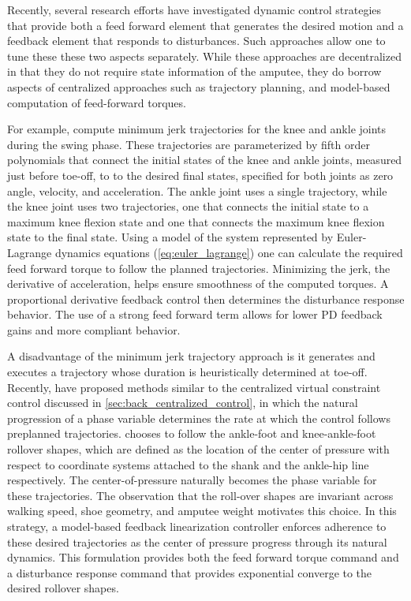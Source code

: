 Recently, several research efforts have investigated dynamic control strategies
that provide both a feed forward element that generates the desired motion and a
feedback element that responds to disturbances. Such approaches allow one to
tune these these two aspects separately. While these approaches are
decentralized in that they do not require state information of the amputee, they
do borrow aspects of centralized approaches such as trajectory planning, and
model-based computation of feed-forward torques.

For example, \citet{lenzi2014speed, lenzi2014minimum} compute minimum jerk
trajectories for the knee and ankle joints during the swing phase. These
trajectories are parameterized by fifth order polynomials that connect the
initial states of the knee and ankle joints, measured just before toe-off, to to
the desired final states, specified for both joints as zero angle, velocity, and
acceleration. The ankle joint uses a single trajectory, while the knee joint
uses two trajectories, one that connects the initial state to a maximum knee
flexion state and one that connects the maximum knee flexion state to the final
state.  Using a model of the system represented by Euler-Lagrange dynamics
equations (\cref{eq:euler_lagrange}) one can calculate the required feed forward
torque to follow the planned trajectories. Minimizing the jerk, the derivative
of acceleration, helps ensure smoothness of the computed torques. A proportional
derivative feedback control then determines the disturbance response behavior.
The use of a strong feed forward term allows for lower PD feedback gains and
more compliant behavior.

A disadvantage of the minimum jerk trajectory approach is it generates and
executes a trajectory whose duration is heuristically determined at toe-off.
Recently, \citet{gregg2014virtual, zhao2016first} have proposed methods similar
to the centralized virtual constraint control discussed in
\cref{sec:back_centralized_control}, in which the natural progression of a phase
variable determines the rate at which the control follows preplanned
trajectories. \citet{gregg2014virtual} chooses to follow the ankle-foot and
knee-ankle-foot rollover shapes, which are defined as the location of the center
of pressure with respect to coordinate systems attached to the shank and the
ankle-hip line respectively. The center-of-pressure naturally becomes the phase
variable for these trajectories. The observation that the roll-over shapes are
invariant across walking speed, shoe geometry, and amputee weight motivates this
choice. In this strategy, a model-based feedback linearization controller
enforces adherence to these desired trajectories as the center of pressure
progress through its natural dynamics. This formulation provides both the feed
forward torque command and a disturbance response command that provides
exponential converge to the desired rollover shapes. 

